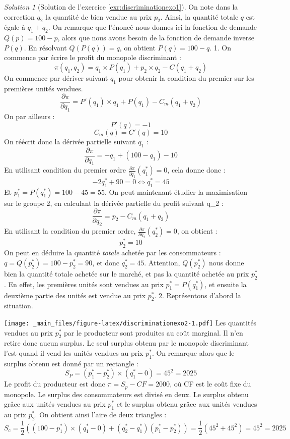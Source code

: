 \documentclass[
]{book}
\theoremstyle{definition}
\theoremstyle{definition}
\theoremstyle{definition}
\theoremstyle{definition}
\theoremstyle{remark}
\newtheorem*{solution}{Solution}
\begin{document}
\begin{solution}[Solution de l'exercice \ref{exr:discriminationexo1}]
On note dans la correction \(q_2\) la quantité de bien vendue au prix \(p_2\).
Ainsi, la quantité totale \(q\) est égale à \(q_1+q_2\).
On remarque que l'énoncé nous donnes ici la fonction de demande \(Q(p)=100-p\), alors que nous avons besoin de la fonction de demande inverse \(P(q)\).
En résolvant \(Q(P(q))=q\), on obtient \(P(q)=100-q\).
1. On commence par écrire le profit du monopole discriminant :
\[\pi(q_1, q_2)=q_1\times P(q_1)+p_2\times q_2-C(q_1+q_2)\]
On commence par dériver suivant \(q_1\) pour obtenir la condition du premier sur les premières unités vendues.
\[\frac{\partial \pi}{\partial q_1}=P'(q_1)\times q_1+P(q_1)-C_m(q_1+q_2)\]
On par ailleurs :
\[P'(q)=-1\]
\[C_m(q)=C'(q)=10\]
On réécrit donc la dérivée partielle suivant \(q_1\) :
\[\frac{\partial \pi}{\partial q_1}=-q_1+(100-q_1)-10\]
En utilisant condition du premier ordre \(\frac{\partial \pi}{\partial q_1}(q_1^*)=0\), cela donne donc :
\[-2q_1^*+90=0\Leftrightarrow q_1^*=45\]
Et \(p_1^*=P(q_1^*)=100-45=55\).
On peut maintenant étudier la maximisation sur le groupe 2, en calculant la dérivée partielle du profit suivant q\_2 :
\[\frac{\partial \pi}{\partial q_2}=p_2-C_m(q_1+q_2)\]
En utilisant la condition du premier ordre, \(\frac{\partial \pi}{\partial q_2}(q_2^*)=0\), on obtient :
\[p_2^*=10\]
On peut en déduire la quantité \emph{totale} achetée par les consommateurs :
\(q=Q(p_2^*)=100-p_2^*=90\), et donc \(q_2^*=45\).
Attention, \(Q(p_2^*)\) nous donne bien la quantité totale achetée sur le marché, et pas la quantité achetée au prix \(p_2^*\).
En effet, les premières unités sont vendues au prix \(p_1^*=P(q_1^*)\), et ensuite la deuxième partie des unités est vendue au prix \(p_2^*\).
2. Représentons d'abord la situation.

\texttt{[image: \_main\_files/figure-latex/discriminationexo2-1.pdf]}
Les quantités vendues au prix \(p_2^*\) par le producteur sont produites au coût marginal.
Il n'en retire donc aucun surplus.
Le seul surplus obtenu par le monopole discriminant l'est quand il vend les unités vendues au prix \(p_1^*\).
On remarque alors que le surplus obtenu est donné par un rectangle :
\[S_P=(p_1^*-p_2^*)\times(q_1^*-0)=45^2=2025\]
Le profit du producteur est donc \(\pi=S_p-CF=2000\), où CF est le coût fixe du monopole.
Le surplus des consommateurs est divisé en deux.
Le surplus obtenu grâce aux unités vendues au prix \(p_1^*\) et le surplus obtenu grâce aux unités vendues au prix \(p_2^*\).
On obtient ainsi l'aire de deux triangles :
\[S_c=\frac{1}{2}\left((100-p_1^*)\times(q_1^*-0)+(q_2^*-q_1^*)(p_1^*-p_2^*)\right)=\frac{1}{2}(45^2+45^2)=45^2=2025\]
\end{solution}
\end{document}
